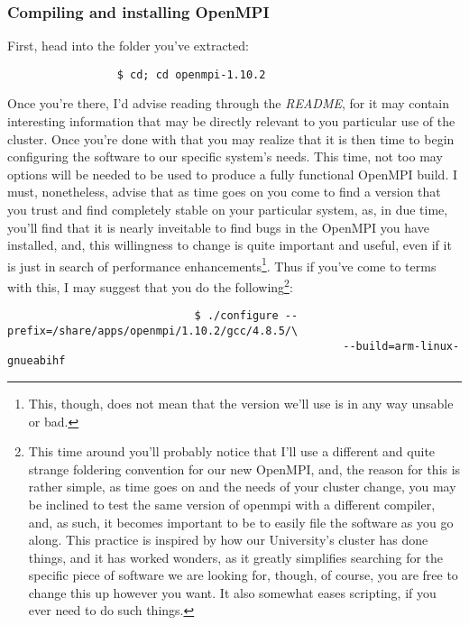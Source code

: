 \documentclass[]{article}
\begin{document}
                 \subsubsection{Compiling and installing OpenMPI}
                 First, head into the folder you've extracted:
                 \begin{lstlisting}
                 $ cd; cd openmpi-1.10.2
                 \end{lstlisting}
                 Once you're there, I'd advise reading through the \textit{README}, for it may contain interesting information that may be directly 
                 relevant to you particular use of the cluster. Once you're done with that you may realize that it is then time to begin configuring the
                 software to our specific system's needs. This time, not too may options will be needed to be used to produce a fully functional 
                 OpenMPI build. I must, nonetheless, advise that as time goes on you come to find a version that you trust and find completely stable
                 on your particular system, as, in due time, you'll find that it is nearly inveitable to find bugs in the OpenMPI you have installed, 
                 and, this willingness to change is quite important and useful, even if it is just in search of performance enhancements\footnote{This, 
                     though, does not mean that the version we'll use is in any way unsable or bad.}. Thus if you've come to terms with this, I may suggest 
                     that you do the following\footnote{This time around you'll probably notice that I'll use a different and quite strange foldering 
                         convention for our new OpenMPI, and, the reason for this is rather simple, as time goes on and the needs of your cluster change, you may 
                             be inclined to test the same version of openmpi with a different compiler, and, as such, it becomes important to be to easily file the 
                             software as you go along. This practice is inspired by how our University's cluster has done things, and it has worked wonders, as it 
                             greatly simplifies searching for the specific piece of software we are looking for, though, of course, you are free to change this up 
                             however you want. It also somewhat eases scripting, if you ever need to do such things.}:
                             \begin{lstlisting}
                             $ ./configure --prefix=/share/apps/openmpi/1.10.2/gcc/4.8.5/\
                                                    --build=arm-linux-gnueabihf
                                                    \end{lstlisting}
\end{document}
